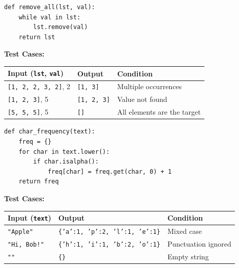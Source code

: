 \begin{solutionbox}
\begin{lstlisting}[language=Python3]
def remove_all(lst, val):
    while val in lst:
        lst.remove(val)
    return lst
\end{lstlisting}
\textbf{Test Cases:}
\begin{table}[H]
    \centering\sffamily
    \begin{tabular}{llp{5cm}}
    \toprule
    \textbf{Input (\texttt{lst}, \texttt{val})} & \textbf{Output} & \textbf{Condition} \\
    \midrule
    \texttt{[1, 2, 2, 3, 2]}, 2 & \texttt{[1, 3]} & Multiple occurrences \\
    \texttt{[1, 2, 3]}, 5 & \texttt{[1, 2, 3]} & Value not found \\
    \texttt{[5, 5, 5]}, 5 & \texttt{[]} & All elements are the target \\
    \bottomrule
    \end{tabular}
\end{table}
\end{solutionbox}

\begin{solutionbox}
\begin{lstlisting}[language=Python3]
def char_frequency(text):
    freq = {}
    for char in text.lower():
        if char.isalpha():
            freq[char] = freq.get(char, 0) + 1
    return freq
\end{lstlisting}
\textbf{Test Cases:}
\begin{table}[H]
    \centering\sffamily
    \begin{tabular}{llp{5cm}}
    \toprule
    \textbf{Input (\texttt{text})} & \textbf{Output} & \textbf{Condition} \\
    \midrule
    \texttt{"Apple"} & \texttt{\{'a':1, 'p':2, 'l':1, 'e':1\}} & Mixed case \\
    \texttt{"Hi, Bob!"} & \texttt{\{'h':1, 'i':1, 'b':2, 'o':1\}} & Punctuation ignored \\
    \texttt{""} & \texttt{\{\}} & Empty string \\
    \bottomrule
    \end{tabular}
\end{table}
\end{solutionbox}

